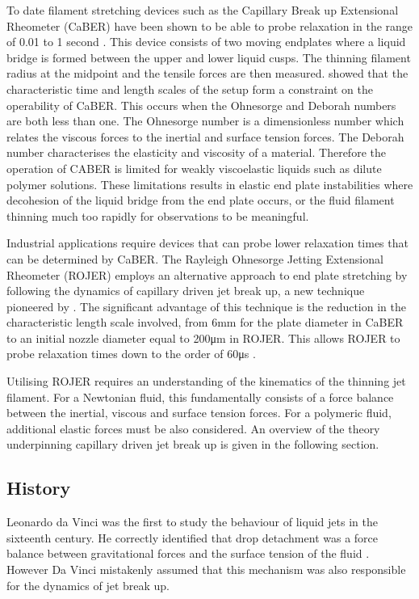 \documentclass[11pt]{article}
\begin{document}
To date filament stretching devices such as the Capillary Break up Extensional Rheometer (CaBER) have been shown to be able to probe relaxation in the range of 0.01 to 1 second \citep{bazilevsky1990liquid}. This device consists of two moving endplates where a liquid bridge is formed between the upper and lower liquid cusps. The thinning filament radius at the midpoint and the tensile forces are then measured. \cite{rodd2004capillary} showed that the characteristic time and length scales of the setup form a constraint on the operability of CaBER. This occurs when the Ohnesorge and Deborah numbers are both less than one. The Ohnesorge number is a dimensionless number which relates the viscous forces to the inertial and surface tension forces. The Deborah number characterises the elasticity and viscosity of a material. Therefore the operation of CABER is limited for weakly viscoelastic liquids such as dilute polymer solutions. These limitations results in elastic end plate instabilities where decohesion of the liquid bridge from the end plate occurs, or the fluid filament thinning much too rapidly for observations to be meaningful. 

Industrial applications require devices that can probe lower relaxation times that can be determined by CaBER. The Rayleigh Ohnesorge Jetting Extensional Rheometer (ROJER) employs an alternative approach to end plate stretching by following the dynamics of capillary driven jet break up, a new technique pioneered by \cite{keshavarz2015studying}. The significant advantage of this technique is the reduction in the characteristic length scale involved, from 6mm for the plate diameter in CaBER to an initial nozzle diameter equal to 200μm in ROJER. This allows ROJER to probe relaxation times down to the order of 60μs \citep{keshavarz2015studying}.

Utilising ROJER requires an understanding of the kinematics of the thinning jet filament. For a Newtonian fluid, this fundamentally consists of a force balance between the inertial, viscous and surface tension forces. For a polymeric fluid, additional elastic forces must be also considered. An overview of the theory underpinning capillary driven jet break up is given in the following section.

\subsection{History}
Leonardo da Vinci was the first to study the behaviour of liquid jets in the sixteenth century. He correctly identified that drop detachment was a force balance between gravitational forces and the surface tension of the fluid \citep{da1999codex}. However Da Vinci mistakenly assumed that this mechanism was also responsible for the dynamics of jet break up.
\end{document}
